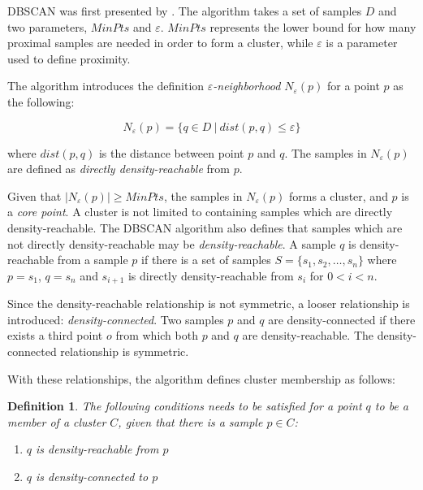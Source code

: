 \documentclass[a4paper]{report}
\newtheorem*{definition}{Definition}
\begin{document}
DBSCAN was first presented by \citet{ester96}. The algorithm takes a set of
samples $D$ and two parameters, $MinPts$ and $\varepsilon$. $MinPts$ represents
the lower bound for how many proximal samples are needed in order to form a
cluster, while $\varepsilon$ is a parameter used to define proximity.

The algorithm introduces the definition \emph{$\varepsilon$-neighborhood}
$N_{\varepsilon}(p)$ for a point $p$ as the following:

\begin{equation}
    N_{\varepsilon}(p) = \{ q \in D ~|~ dist(p,q) \le \varepsilon  \}
    \label{eq:eps}
\end{equation}

where $dist(p,q)$ is the distance between point $p$ and $q$. The samples in
$N_{\varepsilon}(p)$ are defined as \emph{directly density-reachable} from $p$.

Given that
$|N_{\varepsilon}(p)| \ge MinPts$, the samples in $N_{\varepsilon}(p)$ forms a
cluster, and $p$ is a \emph{core point}. A cluster is not limited to containing
samples which are directly density-reachable. The DBSCAN algorithm also defines
that samples which are not directly density-reachable may be
\emph{density-reachable}. A sample $q$ is density-reachable from a sample $p$
if there is a set of samples
$S = \{s_1, s_2, \ldots, s_n\}$ where $p = s_1$, $q = s_n$ and $s_{i+1}$ is
directly density-reachable from $s_i$ for $0 < i < n$.

Since the density-reachable relationship is not symmetric, a looser
relationship is introduced: \emph{density-connected}. Two samples $p$ and
$q$ are density-connected if there exists a third point $o$ from which both
$p$ and $q$ are density-reachable. The density-connected relationship
is symmetric.

With these relationships, the algorithm defines cluster membership as
follows:

\begin{definition}
    The following conditions needs to be satisfied for a point $q$ to be a
    member of a cluster $C$, given that there is a sample $p \in C$:
    \begin{enumerate}
        \item $q$ is density-reachable from $p$
        \item $q$ is density-connected to $p$
    \end{enumerate}
\end{definition}
\end{document}

